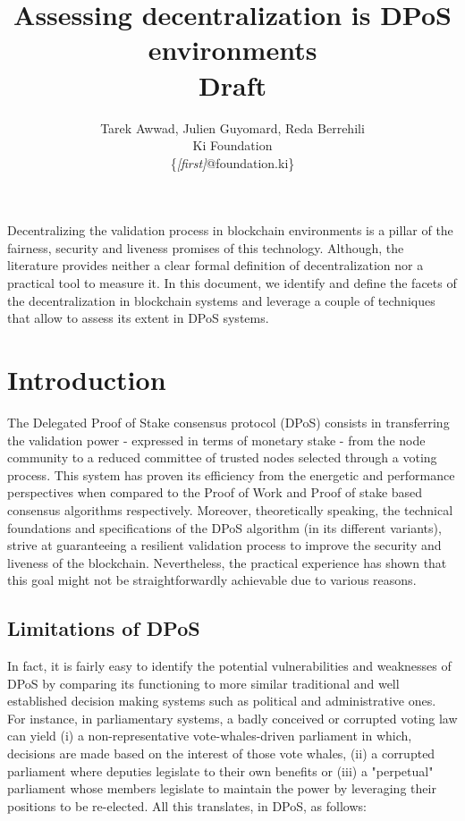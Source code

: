 \documentclass{article}
\begin{document}
\title{Assessing decentralization is DPoS environments\\ \small{Draft}}
\author{\normalsize Tarek Awwad, Julien Guyomard, Reda Berrehili\\Ki Foundation\\\small\{\textit{[first]}@foundation.ki\}}
\maketitle

\begin{abstract}
\end{abstract}
Decentralizing the validation process in blockchain environments is a pillar of the fairness, security and liveness promises of this technology. Although, the literature provides neither a clear formal definition of decentralization nor a practical tool to measure it. In this document, we identify and define the facets of the decentralization in blockchain systems and leverage a couple of techniques that allow to assess its extent in DPoS systems.

\section{Introduction}
\label{sec:intro}
The Delegated Proof of Stake consensus protocol (DPoS) consists in transferring the validation power - expressed in terms of monetary stake - from the node community to a reduced committee of trusted nodes selected through a voting process. This system has proven its efficiency from the energetic and performance perspectives when compared to the Proof of Work and Proof of stake based consensus algorithms respectively. Moreover, theoretically speaking, the technical foundations and specifications of the DPoS algorithm (in its different variants), strive at guaranteeing a resilient validation process to improve the security and liveness of the blockchain. Nevertheless, the practical experience has shown that this goal might not be straightforwardly achievable due to various reasons.

\subsection{Limitations of DPoS}
In fact, it is fairly easy to identify the potential vulnerabilities and weaknesses of DPoS by comparing its functioning to more similar traditional and well established decision making systems such as political and administrative ones. For instance, in parliamentary systems, a badly conceived or corrupted voting law can yield (i) a non-representative vote-whales-driven parliament in which, decisions are made based on the interest of those vote whales, (ii) a corrupted parliament where deputies legislate to their own benefits or (iii) a "perpetual" parliament whose members legislate to maintain the power by leveraging their positions to be re-elected. All this translates, in DPoS, as follows:
\end{document}
